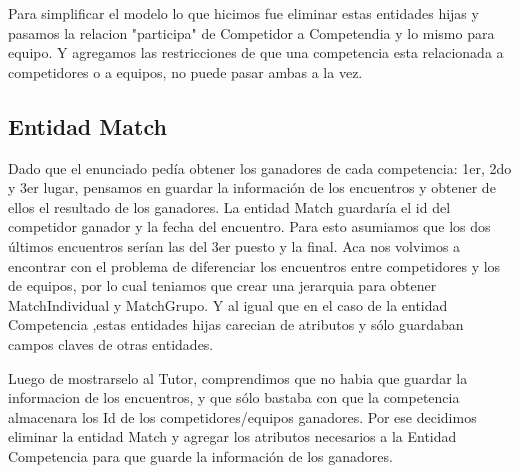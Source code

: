 Para simplificar el modelo lo que hicimos fue eliminar estas entidades hijas y pasamos la relacion "participa" de Competidor a Competendia y lo mismo para equipo. Y agregamos las restricciones de que una competencia esta relacionada a competidores o a equipos, no puede pasar ambas a la vez.

\subsection{Entidad Match}

Dado que el enunciado ped\'ia obtener los ganadores de cada competencia: 1er, 2do y 3er lugar, pensamos en guardar la informaci\'on de los encuentros y obtener de ellos el resultado de los ganadores. La entidad Match guardar\'ia el id del competidor ganador y la fecha del encuentro. Para esto asumiamos que los dos \'ultimos encuentros ser\'ian las del 3er puesto y la final. Aca nos volvimos a encontrar con el problema de diferenciar los encuentros entre competidores y los de equipos, por lo cual teniamos que crear una jerarquia para obtener MatchIndividual y MatchGrupo. Y al igual que en el caso de la entidad Competencia ,estas entidades hijas carecian de atributos y s\'olo guardaban campos claves de otras entidades.

Luego de mostrarselo al Tutor, comprendimos que no habia que guardar la informacion de los encuentros, y que s\'olo
bastaba con que la competencia almacenara los Id de los competidores/equipos ganadores. Por ese decidimos eliminar la entidad Match y agregar los atributos necesarios a la Entidad Competencia para que guarde la informaci\'on de los ganadores.





